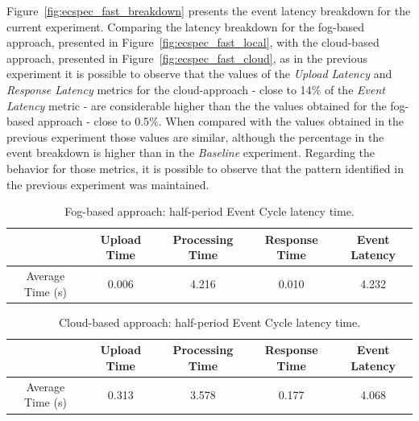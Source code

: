 Figure~\ref{fig:ecspec_fast_breakdown} presents the event latency breakdown for the current experiment.
Comparing the latency breakdown for the fog-based approach, presented in Figure~\ref{fig:ecspec_fast_local},
with the cloud-based approach, presented in Figure~\ref{fig:ecspec_fast_cloud}, as in the previous experiment
it is possible to observe that the values of the \textit{Upload Latency} and \textit{Response Latency}
metrics for the cloud-approach - close to 14$\%$ of the \textit{Event Latency} metric - are considerable
higher than the the values obtained for the fog-based approach - close to 0.5$\%$. When compared with
the values obtained in the previous experiment those values are similar, although the percentage in
the event breakdown is higher than in the \textit{Baseline} experiment. Regarding the behavior for
those metrics, it is possible to observe that the pattern identified in the previous experiment was
maintained.

\begin{table}[ht!]
  \begin{tabular}{|c|c|c|c|c|}
  \hline
  ~                & Upload Time & Processing Time & Response Time & Event Latency \\ \hline
  Average Time (s) & 0.006       & 4.216           & 0.010         & 4.232         \\ \hline
  \end{tabular}
  \caption{Fog-based approach: half-period Event Cycle latency time.}
  \label{table:ecspec_fast_local}
\end{table}

\begin{table}[ht!]
  \begin{tabular}{|c|c|c|c|c|}
  \hline
  ~                & Upload Time & Processing Time & Response Time & Event Latency \\ \hline
  Average Time (s) & 0.313       & 3.578           &  0.177        & 4.068         \\ \hline
  \end{tabular}
  \caption{Cloud-based approach: half-period Event Cycle latency time.}
  \label{table:ecspec_fast_cloud}
\end{table}

